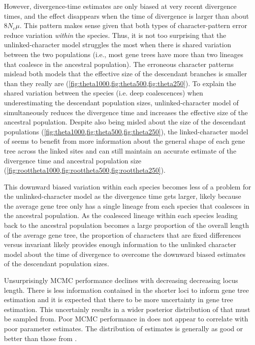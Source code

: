 However, \ecoevolity divergence-time estimates are only biased at
very recent divergence times, and the effect disappears
when the time of divergence is larger than about $8N_e\mu$.
This pattern makes sense given that both types of character-pattern error
reduce variation \emph{within} the species.
Thus, it is not too surprising that the unlinked-character model
struggles the most when there is shared variation between
the two populations (i.e., most gene trees have more than
two lineages that coalesce in the ancestral population).
The erroneous character patterns mislead both models that the effective size of
the descendant branches is smaller than they really are
(\cref{fig:theta1000,fig:theta500,fig:theta250}).
To explain the shared variation between the species (i.e. deep coalescences)
when underestimating the descendant population sizes,
unlinked-character model of \ecoevolity
simultaneously reduces the divergence time and increases the effective
size of the ancestral population.
Despite also being misled about the size of the descendant populations
(\cref{fig:theta1000,fig:theta500,fig:theta250}),
the linked-character model of \beast seems to benefit from more information
about the general shape of each gene tree across the linked sites and can still
maintain an accurate estimate of the divergence time
\timefigsp
and ancestral population size
(\cref{fig:roottheta1000,fig:roottheta500,fig:roottheta250}).

This downward biased variation within each species becomes
less of a problem for the unlinked-character model as the
divergence time gets larger, likely because the average gene
tree only has a single lineage from each species that coalesces
in the ancestral population.
As the coalesced lineage within each species leading back
to the ancestral population becomes a large proportion
of the overall length of the average gene tree,
the proportion of characters that are fixed differences versus invariant
likely provides enough information to
the unlinked character model about the time of divergence to overcome
the downward biased estimates of the descendant population sizes.



Unsurprisingly MCMC performance declines with decreasing decreasing locus length.
There is less information contained in the shorter loci to inform gene tree estimation 
and it is expected that there to be more uncertainty in gene tree estimation.
This uncertainly results in a wider posterior distribution of that must be 
sampled from.
Poor MCMC performance in \beast does not appear to correlate with poor parameter 
estimates. The distribution of estimates is generally as good or better than those 
from \ecoevolity. 


